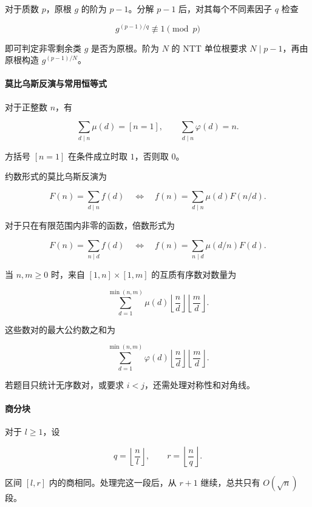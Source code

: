 对于质数 \(p\)，原根 \(g\) 的阶为 \(p-1\)。分解 \(p-1\) 后，对其每个不同素因子 \(q\) 检查

\[
g^{(p-1)/q}\not\equiv1\pmod p
\]

即可判定非零剩余类 \(g\) 是否为原根。阶为 \(N\) 的 NTT 单位根要求 \(N\mid p-1\)，再由原根构造 \(g^{(p-1)/N}\)。

\hypertarget{ux83abux6bd4ux4e4cux65afux53cdux6f14ux4e0eux5e38ux7528ux6052ux7b49ux5f0f}{%
\paragraph{莫比乌斯反演与常用恒等式}\label{ux83abux6bd4ux4e4cux65afux53cdux6f14ux4e0eux5e38ux7528ux6052ux7b49ux5f0f}}

对于正整数 \(n\)，有

\[
\sum_{d\mid n}\mu(d)=[n=1],\qquad
\sum_{d\mid n}\varphi(d)=n.
\]

方括号 \([n=1]\) 在条件成立时取 \(1\)，否则取 \(0\)。

约数形式的莫比乌斯反演为

\[
F(n)=\sum_{d\mid n}f(d)
\quad\Longleftrightarrow\quad
f(n)=\sum_{d\mid n}\mu(d)F(n/d).
\]

对于只在有限范围内非零的函数，倍数形式为

\[
F(n)=\sum_{n\mid d}f(d)
\quad\Longleftrightarrow\quad
f(n)=\sum_{n\mid d}\mu(d/n)F(d).
\]

当 \(n,m\ge0\) 时，来自 \([1,n]\times[1,m]\) 的互质有序数对数量为

\[
\sum_{d=1}^{\min(n,m)}\mu(d)
\left\lfloor\frac{n}{d}\right\rfloor
\left\lfloor\frac{m}{d}\right\rfloor.
\]

这些数对的最大公约数之和为

\[
\sum_{d=1}^{\min(n,m)}\varphi(d)
\left\lfloor\frac{n}{d}\right\rfloor
\left\lfloor\frac{m}{d}\right\rfloor.
\]

若题目只统计无序数对，或要求 \(i<j\)，还需处理对称性和对角线。

\hypertarget{ux5546ux5206ux5757}{%
\paragraph{商分块}\label{ux5546ux5206ux5757}}

对于 \(l\ge1\)，设

\[
q=\left\lfloor\frac{n}{l}\right\rfloor,\qquad
r=\left\lfloor\frac{n}{q}\right\rfloor.
\]

区间 \([l,r]\) 内的商相同。处理完这一段后，从 \(r+1\) 继续，总共只有 \(O(\sqrt n)\) 段。

